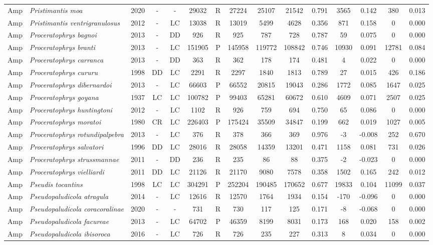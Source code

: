 \documentclass[12pt,openright,oneside,a4paper,english]{abntex2}
\begin{document}
\begin{landscape}
\begin{longtable}{llccccccccccccc}
		Amp&\textit{Pristimantis moa}&2020&-&-&29032&R&27224&25107&21542&0.791&3565&0.142&380&0.013\\
		Amp&\textit{Pristimantis ventrigranulosus}&2012&-&LC&13038&R&13019&5499&4628&0.356&871&0.158&0&0.000\\
		Amp&\textit{Proceratophrys bagnoi}&2013&-&DD&926&R&925&787&728&0.787&59&0.075&0&0.000\\
		Amp&\textit{Proceratophrys branti}&2013&-&LC&151905&P&145958&119772&108842&0.746&10930&0.091&12781&0.084\\
		Amp&\textit{Proceratophrys carranca}&2013&-&DD&363&R&362&178&174&0.481&4&0.022&0&0.000\\
		Amp&\textit{Proceratophrys cururu}&1998&DD&LC&2291&R&2297&1840&1813&0.789&27&0.015&426&0.186\\
		Amp&\textit{Proceratophrys dibernardoi}&2013&-&LC&66603&P&66552&20815&19043&0.286&1772&0.085&1647&0.025\\
		Amp&\textit{Proceratophrys goyana}&1937&LC&LC&100782&P&99403&65281&60672&0.610&4609&0.071&2507&0.025\\
		Amp&\textit{Proceratophrys huntingtoni}&2012&-&LC&1102&R&926&759&694&0.750&65&0.086&0&0.000\\
		Amp&\textit{Proceratophrys moratoi}&1980&CR&LC&226403&P&175424&35509&34847&0.199&662&0.019&1027&0.005\\
		Amp&\textit{Proceratophrys rotundipalpebra}&2013&-&LC&376&R&378&366&369&0.976&-3&-0.008&252&0.670\\
		Amp&\textit{Proceratophrys salvatori}&1996&DD&LC&28016&R&28058&14359&13201&0.471&1158&0.081&731&0.026\\
		Amp&\textit{Proceratophrys strussmannae}&2011&-&DD&236&R&235&86&88&0.375&-2&-0.023&0&0.000\\
		Amp&\textit{Proceratophrys vielliardi}&2011&DD&LC&21126&R&21170&9080&7578&0.358&1502&0.165&242&0.012\\
		Amp&\textit{Pseudis tocantins}&1998&LC&LC&304291&P&252204&190485&170652&0.677&19833&0.104&11099&0.037\\
		Amp&\textit{Pseudopaludicola atragula}&2014&-&LC&12616&R&12570&1764&1934&0.154&-170&-0.096&0&0.000\\
		Amp&\textit{Pseudopaludicola coracoralinae}&2020&-&-&731&R&730&117&125&0.171&-8&-0.068&0&0.000\\
		Amp&\textit{Pseudopaludicola facureae}&2013&-&LC&64702&P&46359&8199&8031&0.173&168&0.020&158&0.002\\
		Amp&\textit{Pseudopaludicola ibisoroca}&2016&-&LC&726&R&726&235&227&0.313&8&0.034&0&0.000\\

\end{longtable}
\end{landscape}
\end{document}
